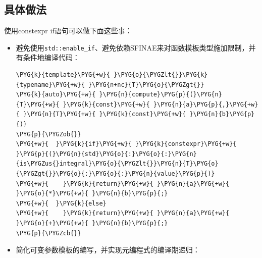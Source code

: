 
\subsection{具体做法}



使用constexpr if语句可以做下面这些事：



\begin{itemize}
\item 避免使用\texttt{std::\allowbreak{}enable\_\allowbreak{}if}、避免依赖SFINAE来对函数模板类型施加限制，并有条件地编译代码：



\begin{codeblockbg}
\begin{Verbatim}[commandchars=\\\{\},breaklines=true,breakanywhere=true,fontsize=\codefont,xleftmargin=17bp]
\PYG{k}{template}\PYG{+w}{ }\PYG{o}{\PYGZlt{}}\PYG{k}{typename}\PYG{+w}{ }\PYG{n+nc}{T}\PYG{o}{\PYGZgt{}}
\PYG{k}{auto}\PYG{+w}{ }\PYG{n}{compute}\PYG{p}{(}\PYG{n}{T}\PYG{+w}{ }\PYG{k}{const}\PYG{+w}{ }\PYG{n}{a}\PYG{p}{,}\PYG{+w}{ }\PYG{n}{T}\PYG{+w}{ }\PYG{k}{const}\PYG{+w}{ }\PYG{n}{b}\PYG{p}{)}
\PYG{p}{\PYGZob{}}
\PYG{+w}{  }\PYG{k}{if}\PYG{+w}{ }\PYG{k}{constexpr}\PYG{+w}{ }\PYG{p}{(}\PYG{n}{std}\PYG{o}{:}\PYG{o}{:}\PYG{n}{is\PYGZus{}integral}\PYG{o}{\PYGZlt{}}\PYG{n}{T}\PYG{o}{\PYGZgt{}}\PYG{o}{:}\PYG{o}{:}\PYG{n}{value}\PYG{p}{)}
\PYG{+w}{    }\PYG{k}{return}\PYG{+w}{ }\PYG{n}{a}\PYG{+w}{ }\PYG{o}{*}\PYG{+w}{ }\PYG{n}{b}\PYG{p}{;}
\PYG{+w}{  }\PYG{k}{else}
\PYG{+w}{    }\PYG{k}{return}\PYG{+w}{ }\PYG{n}{a}\PYG{+w}{ }\PYG{o}{+}\PYG{+w}{ }\PYG{n}{b}\PYG{p}{;}
\PYG{p}{\PYGZcb{}}
\end{Verbatim}
\end{codeblockbg}



\item 简化可变参数模板的编写，并实现元编程式的编译期递归：




\end{itemize}
